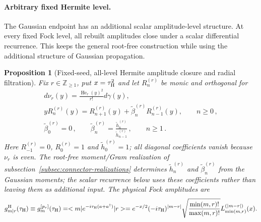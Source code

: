 \documentclass[a4paper,11pt]{article}
\def\ket#1{|#1>}%
\def\bra#1{<#1|}%
\def\dd{d}%
\def\ii{i}%
\def\ee{e}%
\newtheorem{proposition}{Proposition}[section]
\theoremstyle{definition}
\theoremstyle{remark}
\newcommand{\ket}[1]{|#1\rangle}
\newcommand{\bra}[1]{\langle #1|}
\newcommand{\dd}{\mathrm d}
\newcommand{\ii}{\mathrm i}
\newcommand{\ee}{\mathrm e}
\newcommand{\He}{\operatorname{He}}
\newcommand{\thh}{\widetilde h}
\begin{document}
\paragraph{Arbitrary fixed Hermite level.}
The Gaussian endpoint has an additional scalar
amplitude-level structure. 
At every fixed Fock
level, all rebuilt amplitudes close under a scalar differential recurrence.  This keeps the
general root-free construction while using the additional structure of Gaussian propagation.

\begin{proposition}[Fixed-seed, all-level Hermite amplitude closure and radial filtration]
\label{prop:Hermite-all-r-complexity-app}
Fix $r\in\mathbb Z_{\ge1}$, put $x=\tau_{\rm H}^2$ and let
$R_n^{(r)}$ be monic and orthogonal for
\begin{equation}
\begin{gathered}
   \dd\nu_r(y)=\frac{\He_r(y)^2}{r!}\dd\gamma(y),
   \\
   yR_n^{(r)}(y)=R_{n+1}^{(r)}(y)
      +\widetilde\beta_n^{(r)}R_{n-1}^{(r)}(y),
   \qquad n\ge0\,,
   \\
   \widetilde\beta_0^{(r)}=0\,,
   \qquad
   \widetilde\beta_n^{(r)}=
      \frac{\thh_n^{(r)}}{\thh_{n-1}^{(r)}}\,,
   \qquad n\ge1\,.
\end{gathered}
   \label{eq:Hermite-induced-recurrence-app}
\end{equation}
Here $R_{-1}^{(r)}=0$, $R_0^{(r)}=1$ and $\thh_0^{(r)}=1$; all diagonal coefficients vanish
because $\nu_r$ is even.  The root-free moment/Gram realization of
subsection~\ref{subsec:connector-realizations} determines
$\thh_n^{(r)}$ and $\widetilde\beta_n^{(r)}$ from the Gaussian moments; the scalar recurrence
below uses these coefficients rather than leaving them as additional input.
The physical Fock amplitudes are 
\begin{equation}
   g_{m|r}^{\rm H}(\tau_{\rm H})
   \equiv g_m^{[p_r]}(\tau_{\rm H})
   =\bra m\ee^{-\ii\tau_{\rm H}(a+a^\dagger)}\ket r
   =\ee^{-x/2}(-\ii\tau_{\rm H})^{|m-r|}
    \sqrt{\frac{\min(m,r)!}{\max(m,r)!}}
    L_{\min(m,r)}^{(|m-r|)}(x).
   \label{eq:Hermite-Fock-transition-app}
\end{equation}


\end{proposition}
\end{document}
